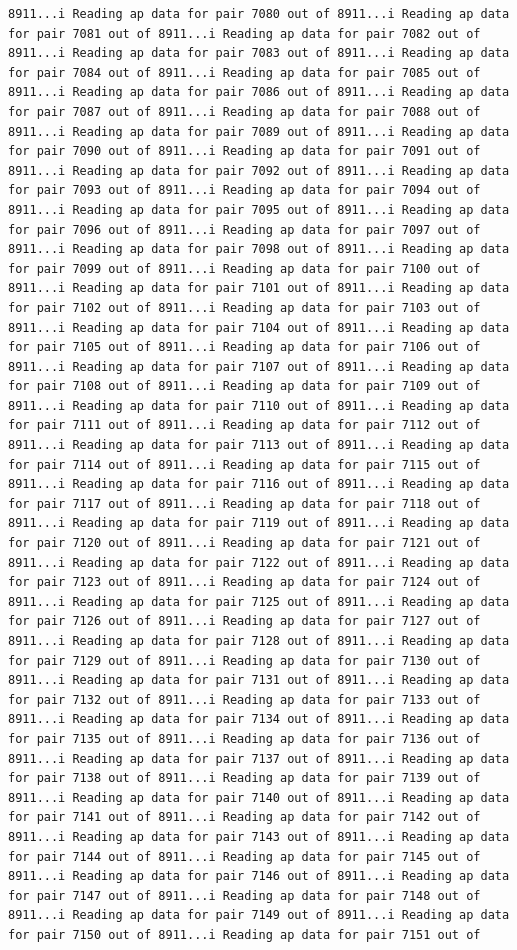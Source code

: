 \documentclass[
]{article}
\begin{document}
\begin{verbatim}
8911...i Reading ap data for pair 7080 out of 8911...i Reading ap data for pair 7081 out of 8911...i Reading ap data for pair 7082 out of 8911...i Reading ap data for pair 7083 out of 8911...i Reading ap data for pair 7084 out of 8911...i Reading ap data for pair 7085 out of 8911...i Reading ap data for pair 7086 out of 8911...i Reading ap data for pair 7087 out of 8911...i Reading ap data for pair 7088 out of 8911...i Reading ap data for pair 7089 out of 8911...i Reading ap data for pair 7090 out of 8911...i Reading ap data for pair 7091 out of 8911...i Reading ap data for pair 7092 out of 8911...i Reading ap data for pair 7093 out of 8911...i Reading ap data for pair 7094 out of 8911...i Reading ap data for pair 7095 out of 8911...i Reading ap data for pair 7096 out of 8911...i Reading ap data for pair 7097 out of 8911...i Reading ap data for pair 7098 out of 8911...i Reading ap data for pair 7099 out of 8911...i Reading ap data for pair 7100 out of 8911...i Reading ap data for pair 7101 out of 8911...i Reading ap data for pair 7102 out of 8911...i Reading ap data for pair 7103 out of 8911...i Reading ap data for pair 7104 out of 8911...i Reading ap data for pair 7105 out of 8911...i Reading ap data for pair 7106 out of 8911...i Reading ap data for pair 7107 out of 8911...i Reading ap data for pair 7108 out of 8911...i Reading ap data for pair 7109 out of 8911...i Reading ap data for pair 7110 out of 8911...i Reading ap data for pair 7111 out of 8911...i Reading ap data for pair 7112 out of 8911...i Reading ap data for pair 7113 out of 8911...i Reading ap data for pair 7114 out of 8911...i Reading ap data for pair 7115 out of 8911...i Reading ap data for pair 7116 out of 8911...i Reading ap data for pair 7117 out of 8911...i Reading ap data for pair 7118 out of 8911...i Reading ap data for pair 7119 out of 8911...i Reading ap data for pair 7120 out of 8911...i Reading ap data for pair 7121 out of 8911...i Reading ap data for pair 7122 out of 8911...i Reading ap data for pair 7123 out of 8911...i Reading ap data for pair 7124 out of 8911...i Reading ap data for pair 7125 out of 8911...i Reading ap data for pair 7126 out of 8911...i Reading ap data for pair 7127 out of 8911...i Reading ap data for pair 7128 out of 8911...i Reading ap data for pair 7129 out of 8911...i Reading ap data for pair 7130 out of 8911...i Reading ap data for pair 7131 out of 8911...i Reading ap data for pair 7132 out of 8911...i Reading ap data for pair 7133 out of 8911...i Reading ap data for pair 7134 out of 8911...i Reading ap data for pair 7135 out of 8911...i Reading ap data for pair 7136 out of 8911...i Reading ap data for pair 7137 out of 8911...i Reading ap data for pair 7138 out of 8911...i Reading ap data for pair 7139 out of 8911...i Reading ap data for pair 7140 out of 8911...i Reading ap data for pair 7141 out of 8911...i Reading ap data for pair 7142 out of 8911...i Reading ap data for pair 7143 out of 8911...i Reading ap data for pair 7144 out of 8911...i Reading ap data for pair 7145 out of 8911...i Reading ap data for pair 7146 out of 8911...i Reading ap data for pair 7147 out of 8911...i Reading ap data for pair 7148 out of 8911...i Reading ap data for pair 7149 out of 8911...i Reading ap data for pair 7150 out of 8911...i Reading ap data for pair 7151 out of 
\end{verbatim}
\end{document}
